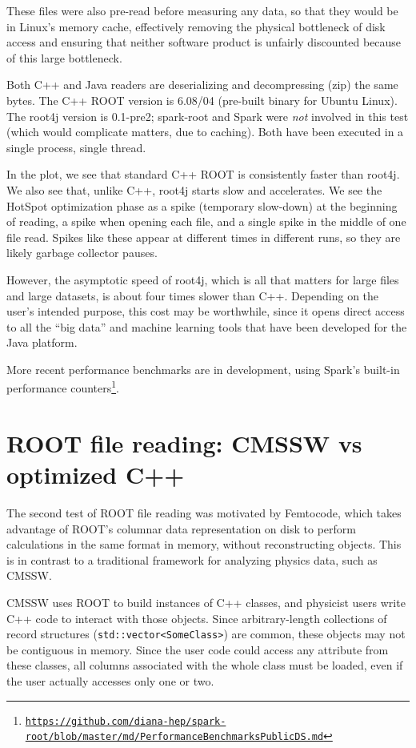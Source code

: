 \documentclass[12pt]{article}
\begin{document}
These files were also pre-read before measuring any data, so that they would be in Linux's memory cache, effectively removing the physical bottleneck of disk access and ensuring that neither software product is unfairly discounted because of this large bottleneck.

Both C++ and Java readers are deserializing and decompressing (zip) the same bytes. The C++ ROOT version is 6.08/04 (pre-built binary for Ubuntu Linux). The root4j version is 0.1-pre2; spark-root and Spark were {\it not} involved in this test (which would complicate matters, due to caching). Both have been executed in a single process, single thread.

In the plot, we see that standard C++ ROOT is consistently faster than root4j. We also see that, unlike C++, root4j starts slow and accelerates. We see the HotSpot optimization phase as a spike (temporary slow-down) at the beginning of reading, a spike when opening each file, and a single spike in the middle of one file read. Spikes like these appear at different times in different runs, so they are likely garbage collector pauses.

However, the asymptotic speed of root4j, which is all that matters for large files and large datasets, is about four times slower than C++. Depending on the user's intended purpose, this cost may be worthwhile, since it opens direct access to all the ``big data'' and machine learning tools that have been developed for the Java platform.

More recent performance benchmarks are in development, using Spark's built-in performance counters\footnote{\href{https://github.com/diana-hep/spark-root/blob/master/md/PerformanceBenchmarksPublicDS.md}{\tt https://github.com/diana-hep/spark-root/blob/master/md/PerformanceBenchmarksPublicDS.md}}.

\section*{ROOT file reading: CMSSW vs optimized C++}

The second test of ROOT file reading was motivated by Femtocode, which takes advantage of ROOT's columnar data representation on disk to perform calculations in the same format in memory, without reconstructing objects. This is in contrast to a traditional framework for analyzing physics data, such as CMSSW.

CMSSW uses ROOT to build instances of C++ classes, and physicist users write C++ code to interact with those objects. Since arbitrary-length collections of record structures ({\tt std::vector<SomeClass>}) are common, these objects may not be contiguous in memory. Since the user code could access any attribute from these classes, all columns associated with the whole class must be loaded, even if the user actually accesses only one or two.
\end{document}
